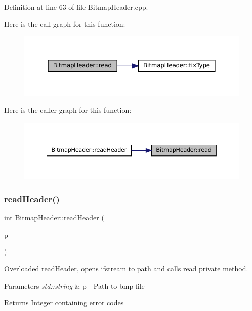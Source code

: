 Definition at line 63 of file Bitmap\+Header.\+cpp.

Here is the call graph for this function\+:
\nopagebreak
\begin{figure}[H]
\begin{center}
\leavevmode
\includegraphics[width=350pt]{classBitmapHeader_a6f91559c339074535445780e99e5f717_cgraph}
\end{center}
\end{figure}
Here is the caller graph for this function\+:
\nopagebreak
\begin{figure}[H]
\begin{center}
\leavevmode
\includegraphics[width=350pt]{classBitmapHeader_a6f91559c339074535445780e99e5f717_icgraph}
\end{center}
\end{figure}
\mbox{\label{classBitmapHeader_a2de360d5111136167f5885bed561bc8c}} 
\subsubsection{\texorpdfstring{readHeader()}{readHeader()}\hspace{0.1cm}{\footnotesize\ttfamily [1/2]}}
{\footnotesize\ttfamily int Bitmap\+Header\+::read\+Header (\begin{DoxyParamCaption}\item[{std\+::string}]{p }\end{DoxyParamCaption})}



Overloaded read\+Header, opens ifstream to path and calls read private method. 


\begin{DoxyParams}{Parameters}
{\em std\+::string} & p -\/ Path to bmp file \\
\hline
\end{DoxyParams}
\begin{DoxyReturn}{Returns}
Integer containing error codes 
\end{DoxyReturn}


